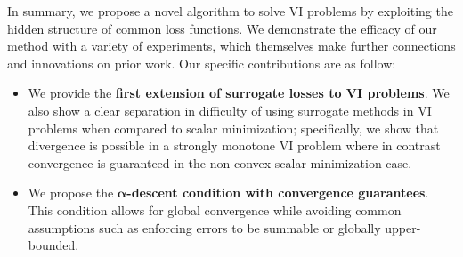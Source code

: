 \documentclass{article} %
\theoremstyle{definition}
\newcommand{\nnumbers}{\mathbb{N}}
\begin{document}
In summary, we propose a novel algorithm to solve VI problems by exploiting the hidden structure of common loss functions. We demonstrate the efficacy of our method with a variety of experiments, which themselves make further connections and innovations on prior work. Our specific contributions are as follow:
\vspace{-8pt}
\begin{itemize}[leftmargin=*]
\setlength\itemsep{0pt}
    \item We provide the \textbf{first extension of surrogate losses to VI problems}.
    We also show a clear separation in difficulty of using surrogate methods in VI problems when compared to scalar minimization; specifically, we show that divergence is possible in a strongly monotone VI problem where in contrast convergence is guaranteed in the non-convex scalar minimization case.
    \item We propose the \textbf{$\mathbf{\alpha}$-descent condition with convergence guarantees}.
    This condition allows for global convergence while avoiding common assumptions such as enforcing errors to be summable or globally upper-bounded.


\end{itemize}
\end{document}
